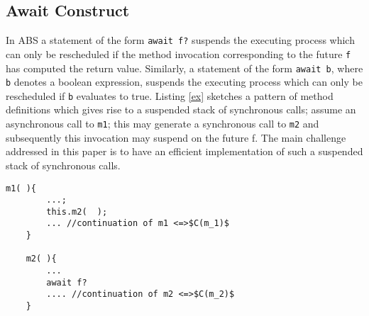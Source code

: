 \subsection{Await Construct}
In ABS  a statement  of the form \lstinline|await f?|
suspends the executing process which can only be rescheduled if the method
invocation corresponding to the future \lstinline|f| has computed the return value.
Similarly,   a statement  of the form \lstinline|await b|, where \lstinline|b|  denotes a boolean expression,  suspends the executing process which can only be rescheduled if  \lstinline|b| evaluates to true.
Listing \ref{ex} sketches a pattern of method definitions which gives rise to a suspended stack of synchronous calls; assume an asynchronous call to \lstinline|m1|; this may generate a synchronous call to \lstinline|m2| and subsequently this invocation may suspend on the future f. The main challenge addressed in this paper is to have an efficient implementation of such a suspended stack of synchronous calls.
%
\begin{lstlisting}[caption=ABS Example, label=ex]
	m1( ){
		...;
		this.m2(  );
		...	//continuation of m1 <=>$C(m_1)$
	}

	m2( ){
		...
		await f?
		.... //continuation of m2 <=>$C(m_2)$
	}
\end{lstlisting}

